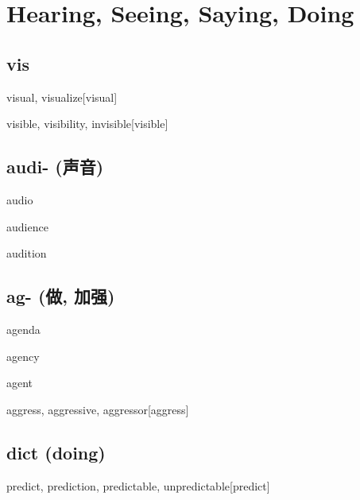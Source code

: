 \chapter{Hearing, Seeing, Saying, Doing}

\section{vis}
\begin{RefWord}{visual, visualize}[visual]
\end{RefWord}

\begin{RefWord}{visible, visibility, invisible}[visible]
\end{RefWord}

\section{audi- (声音)}
\begin{RefWord}{audio}
\end{RefWord}

\begin{RefWord}{audience}
\end{RefWord}

\begin{RefWord}{audition}
\end{RefWord}

\section{{ag- (做, 加强)}}

\begin{RefWord}{agenda}
\end{RefWord}

\begin{RefWord}{agency}
\end{RefWord}

\begin{RefWord}{agent}
\end{RefWord}

\begin{RefWord}{aggress, aggressive, aggressor}[aggress]
\end{RefWord}

\section{dict (doing)}

\begin{RefWord}{predict, prediction, predictable, unpredictable}[predict]
\end{RefWord}

